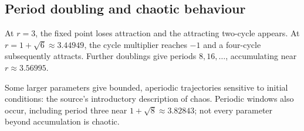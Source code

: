 \subsection{Period doubling and chaotic behaviour}
At $r=3$, the fixed point loses attraction and the attracting two-cycle
appears. At $r=1+\sqrt6\approx3.44949$, the cycle multiplier reaches $-1$
and a four-cycle subsequently attracts. Further doublings give periods
$8,16,\ldots$, accumulating near $r\approx3.56995$.

Some larger parameters give bounded, aperiodic trajectories sensitive to
initial conditions: the source's introductory description of chaos.
Periodic windows also occur, including period three near
$1+\sqrt8\approx3.82843$; not every parameter beyond accumulation is chaotic.

